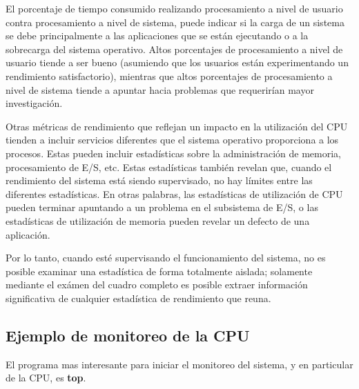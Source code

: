 \documentclass[12pt]{article}
\begin{document}
El porcentaje de tiempo consumido realizando procesamiento a nivel de usuario contra procesamiento a nivel de sistema, puede indicar si la carga de un sistema se debe principalmente a las aplicaciones que se están ejecutando o a la sobrecarga del sistema operativo. Altos porcentajes de procesamiento a nivel de usuario tiende a ser bueno (asumiendo que los usuarios están experimentando un rendimiento satisfactorio), mientras que altos porcentajes de procesamiento a nivel de sistema tiende a apuntar hacia problemas que requerirían mayor investigación.


Otras métricas de rendimiento que reflejan un impacto en la utilización del CPU tienden a incluir servicios diferentes que el sistema operativo proporciona a los procesos. Estas pueden incluir estadísticas sobre la administración de memoria, procesamiento de E/S, etc. Estas estadísticas también revelan que, cuando el rendimiento del sistema está siendo supervisado, no hay límites entre las diferentes estadísticas. En otras palabras, las estadísticas de utilización de CPU pueden terminar apuntando a un problema en el subsistema de E/S, o las estadísticas de utilización de memoria pueden revelar un defecto de una aplicación.

Por lo tanto, cuando esté supervisando el funcionamiento del sistema, no es posible examinar una estadística de forma totalmente aislada; solamente mediante el exámen del cuadro completo es posible extraer información significativa de cualquier estadística de rendimiento que reuna.

\subsection*{Ejemplo de monitoreo de la CPU}

El programa mas interesante para iniciar el monitoreo del sistema, y en particular de la CPU, es \textbf{top}.

\end{document}
